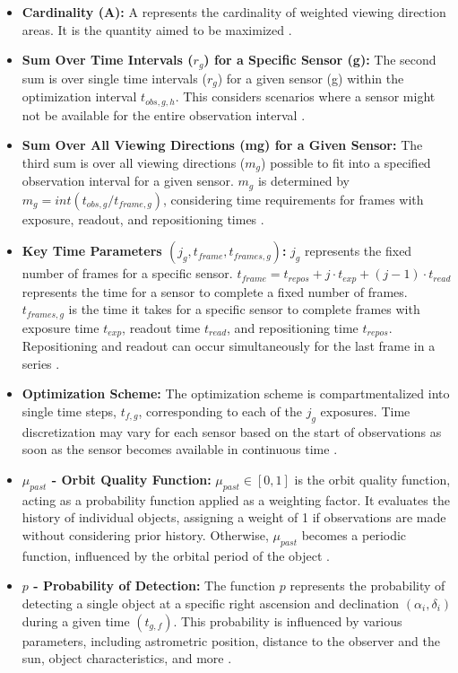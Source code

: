 \begin{itemize}
	\item \textbf{Cardinality (A):} A represents the cardinality of weighted viewing direction areas. It is the quantity aimed to be maximized \cite{fruh3}.
	\item \textbf{Sum Over Time Intervals ($r_g$) for a Specific Sensor (g):} The second sum is over single time intervals ($r_g$) for a given sensor (g) within the optimization interval $t_{obs,g,h}$. This considers scenarios where a sensor might not be available for the entire observation interval \cite{fruh3}.
	\item \textbf{Sum Over All Viewing Directions (mg) for a Given Sensor:} The third sum is over all viewing directions ($m_g$) possible to fit into a specified observation interval for a given sensor. $m_g$ is determined by $m_g = int(t_{obs,g}/t_{frame,g})$, considering time requirements for frames with exposure, readout, and repositioning times \cite{fruh3}.
	\item \textbf{Key Time Parameters $(j_g, t_{frame}, t_{frames,g})$:}  $j_g$ represents the fixed number of frames for a specific sensor. $t_{frame} = t_{repos} + j · t_{exp} + (j − 1)· t_{read}$ represents the time for a sensor to complete a fixed number of frames. $t_{frames,g}$ is the time it takes for a specific sensor to complete frames with exposure time $t_{exp}$, readout time $t_{read}$, and repositioning time $t_{repos}$. Repositioning and readout can occur simultaneously for the last frame in a series \cite{fruh3}.
	\item \textbf{Optimization Scheme:}  The optimization scheme is compartmentalized into single time steps, $t_{f,g}$, corresponding to each of the $j_g$ exposures. Time discretization may vary for each sensor based on the start of observations as soon as the sensor becomes available in continuous time \cite{fruh3}.
	\item \textbf{$\mu_{past}$ - Orbit Quality Function:} $\mu_{past} ∈ [0, 1]$ is the orbit quality function, acting as a probability function applied as a weighting factor. It evaluates the history of individual objects, assigning a weight of 1 if observations are made without considering prior history. Otherwise, $\mu_{past}$ becomes a periodic function, influenced by the orbital period of the object \cite{fruh3}.
	\item \textbf{$p$ - Probability of Detection:} The function $p$ represents the probability of detecting a single object at a specific right ascension and declination $(\alpha_i, \delta_i)$ during a given time $(t_{g,f})$. This probability is influenced by various parameters, including astrometric position, distance to the observer and the sun, object characteristics, and more \cite{fruh3}.

\end{itemize}
